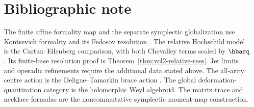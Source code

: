 \chapter{Bibliographic note}
The finite affine formality map and the separate symplectic globalization use Kontsevich formality and its Fedosov resolution \cite{KontsevichDQ,DolgushevCov,CalaqueDolgushevHalbout}.  The relative Hochschild model is the Cartan--Eilenberg comparison, with both Chevalley terms scaled by $\hbarq$.  Its finite-base resolution proof is Theorem~\ref{thm:vol2-relative-rees}.  Jet limits and operadic refinements require the additional data stated above.  The all-arity centre action is the Deligne--Tamarkin brace action \cite{McClureSmith,KontsevichSoibelmanDeligne}.  The global deformation-quantization category is the holomorphic Weyl algebroid.  The matrix trace and necklace formulas are the noncommutative symplectic moment-map construction.
